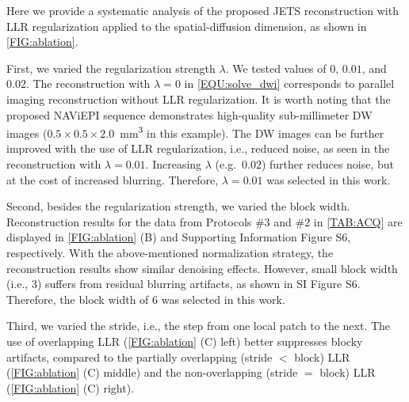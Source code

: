 \documentclass[preprint,12pt,authoryear,review]{elsarticle}
\begin{document}
    Here we provide a systematic analysis of
    the proposed JETS reconstruction
    with LLR regularization applied to
    the spatial-diffusion dimension, as shown in \cref{FIG:ablation}.

    First, we varied the regularization strength $\lambda$.
    We tested values of $0$, $0.01$, and $0.02$.
    The reconstruction with $\lambda = 0$ in \cref{EQU:solve_dwi}
    corresponds to parallel imaging reconstruction
    without LLR regularization.
    It is worth noting that the proposed NAViEPI sequence
    demonstrates high-quality sub-millimeter DW images
    ($0.5\times0.5\times2.0$~\si{\cubic\mm} in this example).
    The DW images can be further improved
    with the use of LLR regularization, i.e., reduced noise,
    as seen in the reconstruction with $\lambda=0.01$.
    Increasing $\lambda$ (e.g.~$0.02$) further reduces noise,
    but at the cost of increased blurring.
    Therefore, $\lambda=0.01$ was selected in this work.

    Second, besides the regularization strength,
    we varied the block width.
    Reconstruction results for the data
    from Protocols \#3 and \#2 in \cref{TAB:ACQ}
    are displayed in \cref{FIG:ablation} (B) and
    Supporting Information Figure S6, respectively.
    With the above-mentioned normalization strategy,
    the reconstruction results show similar denoising effects.
    However, small block width (i.e., 3) suffers from residual blurring artifacts,
    as shown in SI Figure S6. Therefore, the block width of 6 was selected in this work.

    Third, we varied the stride, i.e.,
    the step from one local patch to the next.
    The use of overlapping LLR
    (\cref{FIG:ablation} (C) left)
    better suppresses blocky artifacts,
    compared to the partially overlapping (stride $<$ block) LLR
    (\cref{FIG:ablation} (C) middle)
    and the non-overlapping (stride $=$ block) LLR
    (\cref{FIG:ablation} (C) right).
\end{document}
